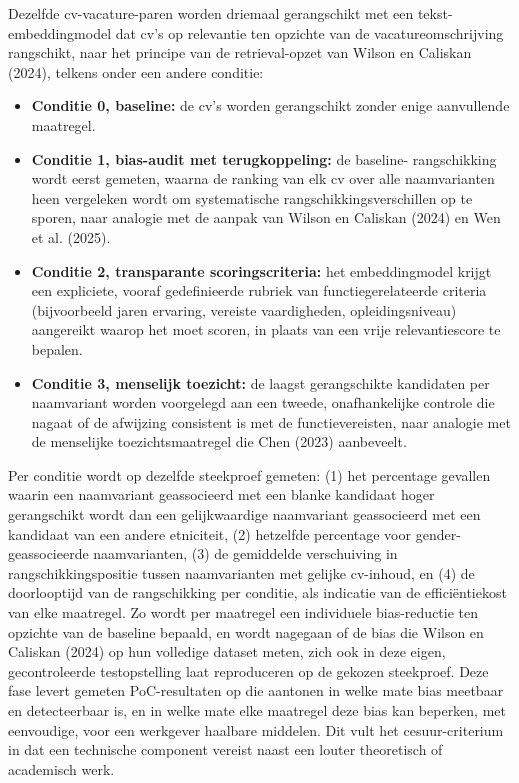 \documentclass{hogent-article}
\begin{document}
Dezelfde cv-vacature-paren worden driemaal gerangschikt met een
tekst-embeddingmodel dat cv's op relevantie ten opzichte van de
vacatureomschrijving rangschikt, naar het principe van de retrieval-opzet
van Wilson en Caliskan (2024), telkens onder een andere conditie:
\begin{itemize}
  \item \textbf{Conditie 0, baseline:} de cv's worden gerangschikt zonder
    enige aanvullende maatregel.
  \item \textbf{Conditie 1, bias-audit met terugkoppeling:} de baseline-
    rangschikking wordt eerst gemeten, waarna de ranking van elk cv over
    alle naamvarianten heen vergeleken wordt om systematische
    rangschikkingsverschillen op te sporen, naar analogie met de aanpak van
    Wilson en Caliskan (2024) en Wen et al. (2025).
  \item \textbf{Conditie 2, transparante scoringscriteria:} het
    embeddingmodel krijgt een expliciete, vooraf gedefinieerde rubriek van
    functiegerelateerde criteria (bijvoorbeeld jaren ervaring, vereiste
    vaardigheden, opleidingsniveau) aangereikt waarop het moet scoren, in
    plaats van een vrije relevantiescore te bepalen.
  \item \textbf{Conditie 3, menselijk toezicht:} de laagst gerangschikte
    kandidaten per naamvariant worden voorgelegd aan een tweede,
    onafhankelijke controle die nagaat of de afwijzing consistent is met de
    functievereisten, naar analogie met de menselijke toezichtsmaatregel die
    Chen (2023) aanbeveelt.
\end{itemize}

Per conditie wordt op dezelfde steekproef gemeten: (1) het percentage
gevallen waarin een naamvariant geassocieerd met een blanke kandidaat hoger
gerangschikt wordt dan een gelijkwaardige naamvariant geassocieerd met een
kandidaat van een andere etniciteit, (2) hetzelfde percentage voor
gender-geassocieerde naamvarianten, (3) de gemiddelde verschuiving in
rangschikkingspositie tussen naamvarianten met gelijke cv-inhoud, en (4) de
doorlooptijd van de rangschikking per conditie, als indicatie van de
efficiëntiekost van elke maatregel. Zo wordt per maatregel een individuele
bias-reductie ten opzichte van de baseline bepaald, en wordt nagegaan of de
bias die Wilson en Caliskan (2024) op hun volledige dataset meten, zich ook
in deze eigen, gecontroleerde testopstelling laat reproduceren op de
gekozen steekproef. Deze fase levert gemeten PoC-resultaten op die aantonen
in welke mate bias meetbaar en detecteerbaar is, en in welke mate elke
maatregel deze bias kan beperken, met eenvoudige, voor een werkgever
haalbare middelen. Dit vult het cesuur-criterium in dat een technische
component vereist naast een louter theoretisch of academisch werk.
\end{document}
